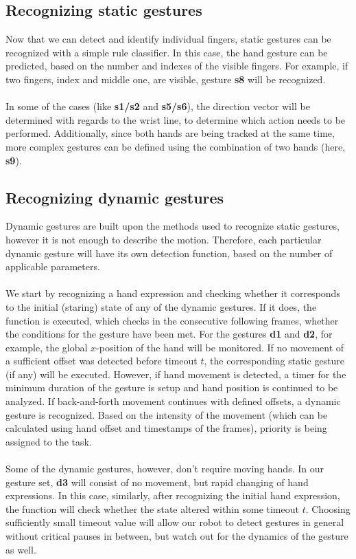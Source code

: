 \documentclass[a4paper,11pt,oneside]{article}
\begin{document}
 
  \subsection{Recognizing static gestures}
  
 Now that we can detect and identify individual fingers, static gestures can be recognized with a simple rule classifier. In this case, the hand gesture can be predicted, based on the number and indexes of the visible fingers. For example, if two fingers, index and middle one, are visible, gesture \textbf{s8} will be recognized.\\
 \\
 In some of the cases (like \textbf{s1/s2} and \textbf{s5/s6}), the direction vector will be determined with regards to the wrist line, to determine which action needs to be performed. Additionally, since both hands are being tracked at the same time, more complex gestures can be defined using the combination of two hands (here, \textbf{s9}).
  
  \subsection{Recognizing dynamic gestures}
  
  Dynamic gestures are built upon the methods used to recognize static gestures, however it is not enough to describe the motion. Therefore, each particular dynamic gesture will have its own detection function, based on the number of applicable parameters.\\
  \\
  We start by recognizing a hand expression and checking whether it corresponds to the initial (staring) state of any of the dynamic gestures. If it does, the function is executed, which checks in the consecutive following frames, whether the conditions for the gesture have been met. For the gestures \textbf{d1} and \textbf{d2}, for example, the global $x$-position of the hand will be monitored. If no movement of a sufficient offset was detected before timeout $t$, the corresponding static gesture (if any) will be executed. However, if hand movement is detected, a timer for the minimum duration of the gesture is setup and hand position is continued to be analyzed. If back-and-forth movement continues with defined offsets, a dynamic gesture is recognized. Based on the intensity of the movement (which can be calculated using hand offset and timestamps of the frames), priority is being assigned to the task.\\
  \\
  Some of the dynamic gestures, however, don't require moving hands. In our gesture set, \textbf{d3} will consist of no movement, but rapid changing of hand expressions. In this case, similarly, after recognizing the initial hand expression, the function will check whether the state altered within some timeout $t$. Choosing sufficiently small timeout value will allow our robot to detect gestures in general without critical pauses in between, but watch out for the dynamics of the gesture as well.
  
\end{document}
